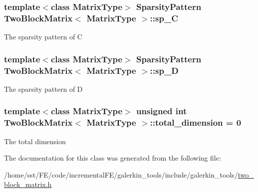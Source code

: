 \subsubsection[{\texorpdfstring{sp\+\_\+C}{sp_C}}]{\setlength{\rightskip}{0pt plus 5cm}template$<$class Matrix\+Type$>$ {\bf Sparsity\+Pattern} {\bf Two\+Block\+Matrix}$<$ Matrix\+Type $>$\+::sp\+\_\+C\hspace{0.3cm}{\ttfamily [protected]}}\hypertarget{class_two_block_matrix_a45d6e534ad775577c86e9ac9a116014e}{}\label{class_two_block_matrix_a45d6e534ad775577c86e9ac9a116014e}
The sparsity pattern of C 
\subsubsection[{\texorpdfstring{sp\+\_\+D}{sp_D}}]{\setlength{\rightskip}{0pt plus 5cm}template$<$class Matrix\+Type$>$ {\bf Sparsity\+Pattern} {\bf Two\+Block\+Matrix}$<$ Matrix\+Type $>$\+::sp\+\_\+D\hspace{0.3cm}{\ttfamily [protected]}}\hypertarget{class_two_block_matrix_adb1833352096be79279134b218659665}{}\label{class_two_block_matrix_adb1833352096be79279134b218659665}
The sparsity pattern of D 
\subsubsection[{\texorpdfstring{total\+\_\+dimension}{total_dimension}}]{\setlength{\rightskip}{0pt plus 5cm}template$<$class Matrix\+Type$>$ unsigned int {\bf Two\+Block\+Matrix}$<$ Matrix\+Type $>$\+::total\+\_\+dimension = 0\hspace{0.3cm}{\ttfamily [protected]}}\hypertarget{class_two_block_matrix_a7d63b4c4c1e499c9f9913444dc5fd6b6}{}\label{class_two_block_matrix_a7d63b4c4c1e499c9f9913444dc5fd6b6}
The total dimension 

The documentation for this class was generated from the following file\+:\begin{DoxyCompactItemize}
\item 
/home/sst/\+F\+E/code/incremental\+F\+E/galerkin\+\_\+tools/include/galerkin\+\_\+tools/\hyperlink{two__block__matrix_8h}{two\+\_\+block\+\_\+matrix.\+h}\end{DoxyCompactItemize}
